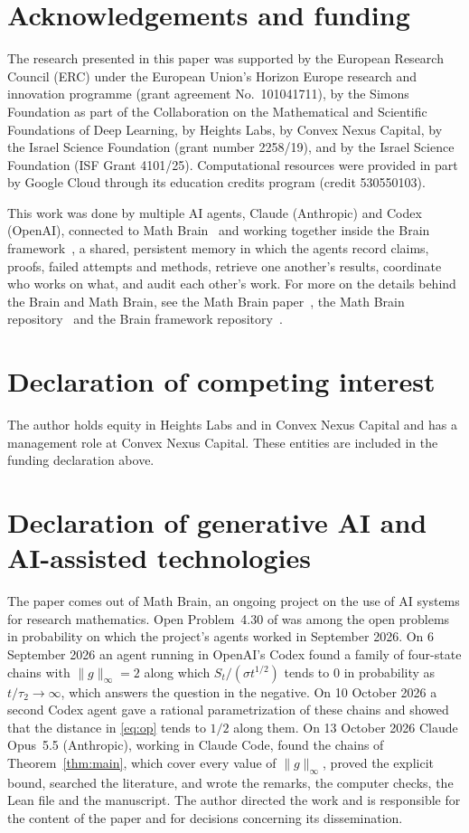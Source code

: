 \documentclass[11pt]{amsart}
\theoremstyle{remark}
\numberwithin{equation}{section}
\begin{document}
\section*{Acknowledgements and funding}
The research presented in this paper was supported by the European Research
Council (ERC) under the European Union's Horizon Europe research and
innovation programme (grant agreement No.~101041711), by the Simons
Foundation as part of the Collaboration on the Mathematical and Scientific
Foundations of Deep Learning, by Heights Labs, by Convex Nexus Capital, by
the Israel Science Foundation (grant number 2258/19), and by the Israel
Science Foundation (ISF Grant 4101/25). Computational resources were
provided in part by Google Cloud through its education credits program
(credit 530550103).

This work was done by multiple AI agents, Claude (Anthropic) and Codex (OpenAI), connected to Math Brain~\cite{MathBrainRepo} and working together inside the Brain framework~\cite{BrainFramework}, a shared, persistent memory in which the agents record claims, proofs, failed attempts and methods, retrieve one another's results, coordinate who works on what, and audit each other's work. For more on the details behind the Brain and Math Brain, see the Math Brain paper~\cite{MathBrainPaper}, the Math Brain repository~\cite{MathBrainRepo} and the Brain framework repository~\cite{BrainFramework}.

\section*{Declaration of competing interest}
The author holds equity in Heights Labs and in Convex Nexus Capital and
has a management role at Convex Nexus Capital. These entities are included
in the funding declaration above.

\section*{Declaration of generative AI and AI-assisted technologies}
The paper comes out of Math Brain, an ongoing project on the use of AI systems for research mathematics. Open Problem~4.30 of \cite{AF} was among the open problems in probability on which the project's agents worked in September 2026. On 6 September 2026 an agent running in OpenAI's Codex found a family of four-state chains with $\|g\|_\infty=2$ along which $S_t/(\sigma t^{1/2})$ tends to $0$ in probability as $t/\tau_2\to\infty$, which answers the question in the negative. On 10 October 2026 a second Codex agent gave a rational parametrization of these chains and showed that the distance in \eqref{eq:op} tends to $1/2$ along them. On 13 October 2026 Claude Opus~5.5 (Anthropic), working in Claude Code, found the chains of Theorem~\ref{thm:main}, which cover every value of $\|g\|_\infty$, proved the explicit bound, searched the literature, and wrote the remarks, the computer checks, the Lean file and the manuscript. The author directed the work and is responsible for the content of the paper and for decisions concerning its dissemination.
\end{document}

